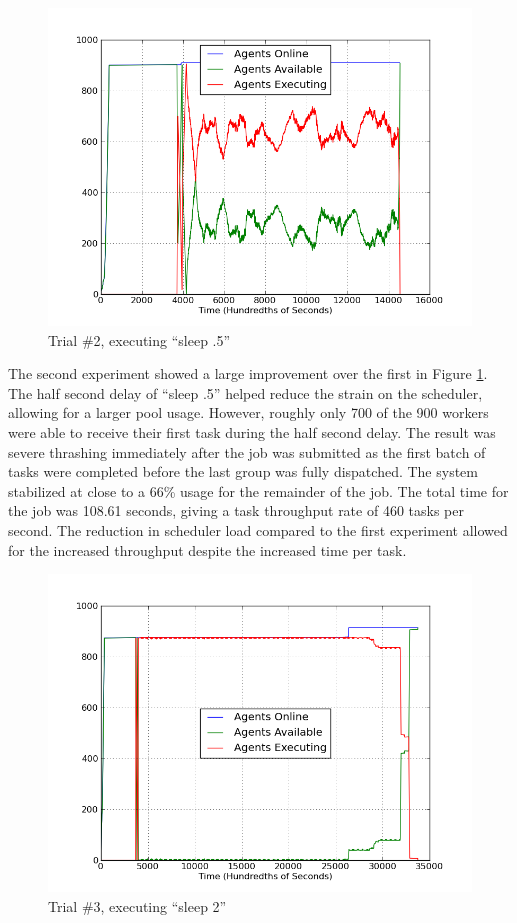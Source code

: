 \begin{figure}
\includegraphics[width=\columnwidth]{figures/sleep1}
\caption{\label{fig:Trial2}Trial \#2, executing ``sleep .5''}
\end{figure}


The second experiment showed a large improvement over the first in
Figure \ref{fig:Trial2}. The half second delay of {}``sleep .5''
helped reduce the strain on the scheduler, allowing for a larger pool
usage. However, roughly only 700 of the 900 workers were able to receive
their first task during the half second delay. The result was severe
thrashing immediately after the job was submitted as the first batch
of tasks were completed before the last group was fully dispatched.
The system stabilized at close to a 66\% usage for the remainder of
the job. The total time for the job was 108.61 seconds, giving a task
throughput rate of 460 tasks per second. The reduction in scheduler
load compared to the first experiment allowed for the increased throughput
despite the increased time per task.

\begin{figure}
\includegraphics[width=\columnwidth]{figures/sleep2}
\caption{\label{fig:Trial3}Trial \#3, executing ``sleep 2''}
\end{figure}


